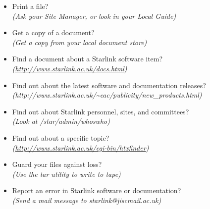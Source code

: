 \documentclass[twoside,11pt,nolof]{starlink}
\begin{document}
\begin{itemize}
\item Print a file?\\
\hspace*{10mm} \emph{(Ask your Site Manager, or look in your Local Guide)}
\item Get a copy of a document?\\
\hspace*{10mm} \emph{(Get a copy from your local document store)}
\item Find a document about a Starlink software item?\\
\hspace*{10mm} \emph{(\url{http://www.starlink.ac.uk/docs.html})}
\item Find out about the latest software and documentation releases?\\
\hspace*{10mm}
\emph{(http://www.starlink.ac.uk/\~{}cac/publicity/new\_products.html)}
\item Find out about Starlink personnel, sites, and committees?\\
\hspace*{10mm} \emph{(Look at /star/\-admin/\-whoswho)}
\item Find out about a specific topic?\\
\hspace*{10mm} \emph{(\url{http://www.starlink.ac.uk/cgi-bin/htxfinder})}
\item Guard your files against loss?\\
\hspace*{10mm} \emph{(Use the tar utility to write to tape)}
\item Report an error in Starlink software or documentation?\\
\hspace*{10mm} \emph{(Send a mail message to starlink@jiscmail.ac.uk)}
\end{itemize}
\end{document}
